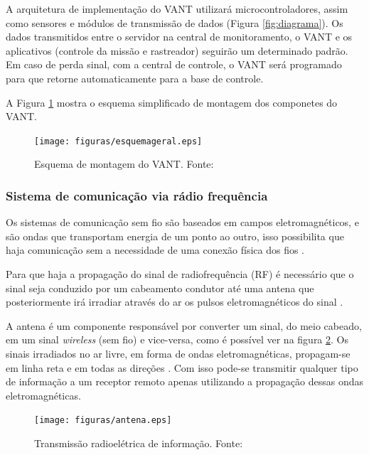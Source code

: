 A arquitetura de implementação do VANT utilizará microcontroladores, assim como sensores e módulos de transmissão de dados (Figura \ref{fig:diagrama}).
Os dados transmitidos entre o servidor na central de monitoramento, o VANT e os aplicativos (controle da missão e rastreador) 
seguirão um determinado padrão. Em caso de perda sinal, com a central de controle, o VANT será programado para que retorne 
automaticamente para a base de controle.

A Figura \ref{fig:esquemageral} mostra o esquema simplificado de montagem dos componetes do VANT.

\begin{figure}[H]
	\centering
	  \texttt{[image: figuras/esquemageral.eps]}
	\caption{Esquema de montagem do VANT. Fonte:\cite{esquematico}}
	\label{fig:esquemageral}
\end{figure}

\pagebreak



\subsubsection{Sistema de comunicação via rádio frequência}

Os sistemas de comunicação sem fio são baseados em campos eletromagnéticos, e são ondas que transportam energia de um ponto ao outro, 
isso possibilita que haja comunicação sem a necessidade de uma conexão física dos fios \cite{VALLE1}. 

Para que haja a propagação do sinal de radiofrequência (RF) é necessário que o sinal seja conduzido por um cabeamento condutor até uma
antena que posteriormente irá irradiar através do ar os pulsos eletromagnéticos do sinal \cite{VALLE1}. 

A antena é um componente responsável por converter um sinal, do meio cabeado, em um sinal \textit{wireless} (sem fio) e vice-versa, 
como é possível
ver na figura \ref{fig:antena}. Os sinais irradiados no ar livre, em forma de ondas eletromagnéticas, propagam-se em linha reta e em 
todas as direções 
\cite{Rappaport2}. Com isso pode-se transmitir qualquer tipo de informação a um receptor remoto apenas utilizando a propagação dessas ondas 
eletromagnéticas.

\begin{figure}[H]
	\centering
	  \texttt{[image: figuras/antena.eps]}
	\caption{Transmissão radioelétrica de informação. Fonte: \cite{antena}}
	\label{fig:antena}
\end{figure}

